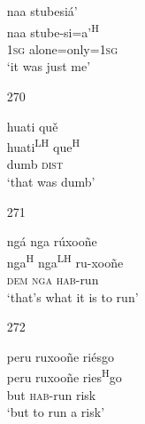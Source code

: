 \begin{itemize}
\glll   naa stubesi\'{a}' \\
naa stube-si=a'\textsuperscript{H} \\
\textsc{1sg} alone=only=\textsc{1sg}\\
\glt `it was just me'
 


\item[270]
 
\glll   huati qu\v{e} \\
 huati\textsuperscript{LH} que\textsuperscript{H}\\
dumb \textsc{dist}\\
\glt `that was dumb'
 


\item[271]
 
\glll   ng\'{a} nga r\'{u}xoo\~{n}e \\
 nga\textsuperscript{H} nga\textsuperscript{LH} ru-xoo\~{n}e\\
 \textsc{dem} \textsc{nga} \textsc{hab}-run\\
\glt `that's what it is to run'
 


\item[272]
 
\glll   peru  ruxoo\~{n}e ri\'{e}sgo\\
peru  ruxoo\~{n}e ries\textsuperscript{H}go\\
but \textsc{hab}-run risk\\
\glt `but to run a risk'
 



\end{itemize}



